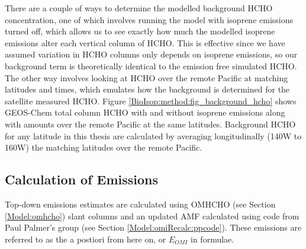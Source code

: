     There are a couple of ways to determine the modelled background HCHO concentration, one of which involves running the model with isoprene emissions turned off, which allows us to see exactly how much the modelled isoprene emissions alter each vertical column of HCHO.
    This is effective since we have assumed variation in HCHO columns only depends on isoprene emissions, so our background term is theoretically identical to the emission free simulated HCHO.
    The other way involves looking at HCHO over the remote Pacific at matching latitudes and times, which emulates how the background is determined for the satellite measured HCHO.
    Figure \ref{BioIsop:method:fig_background_hcho} shows GEOS-Chem total column HCHO with and without isoprene emissions along with amounts over the remote Pacific at the same latitudes.
    Background HCHO for any latitude in this thesis are calculated by averaging longitudinally (140\degr W to 160\degr W) the matching latitudes over the remote Pacific.
    
    
    
    
  \subsection{Calculation of Emissions}
    \label{BioIsop:method:calculation}
   
    Top-down emissions estimates are calculated using OMHCHO (see Section \ref{Model:omhcho}) slant columns and an updated AMF calculated using code from Paul Palmer's group (see Section \ref{Model:omiRecalc:ppcode}).
    These emissions are referred to as the a postiori from here on, or $E_{OMI}$ in formulae.
    
